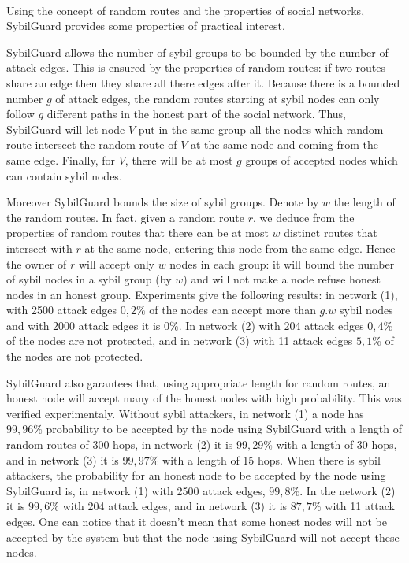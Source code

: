 \documentclass[a4paper,11pt]{article}
\begin{document}
\paragraph{}
Using the concept of random routes and the properties of social networks, SybilGuard provides some properties of practical interest.

SybilGuard allows the number of sybil groups to be bounded by the number of attack edges.
This is ensured by the properties of random routes: if two routes share an edge then they share all there edges after it.
Because there is a bounded number $g$ of attack edges, the random routes starting at sybil nodes can only follow $g$ different paths in the honest part of the social network.
Thus, SybilGuard will let node $V$ put in the same group all the nodes which random route intersect the random route of $V$ at the same node and coming from the same edge.
Finally, for $V$, there will be at most $g$ groups of accepted nodes which can contain sybil nodes. 

Moreover SybilGuard bounds the size of sybil groups.
Denote by $w$ the length of the random routes.
In fact, given a random route $r$, we deduce from the properties of random routes that there can be at most $w$ distinct routes that intersect with $r$ at the same node, entering this node from the same edge.
Hence the owner of $r$ will accept only $w$ nodes in each group: it will bound the number of sybil nodes in a sybil group (by $w$) and will not make a node refuse honest nodes in an honest group.
Experiments give the following results: in network (1), with 2500 attack edges $0,2\%$ of the nodes can accept more than $g.w$ sybil nodes and with 2000 attack edges it is $0\%$.
In network (2) with 204 attack edges $0,4\%$ of the nodes are not protected, and in network (3) with 11 attack edges $5,1\%$ of the nodes are not protected.

SybilGuard also garantees that, using appropriate length for random routes, an honest node will accept many of the honest nodes with high probability. 
This was verified experimentaly.
Without sybil attackers, in network (1) a node has $99,96\%$ probability to be accepted by the node using SybilGuard with a length of random routes of 300 hops, in network (2) it is $99,29\%$ with a length of 30 hops, and in network (3) it is $99,97\%$ with a length of 15 hops.
When there is sybil attackers, the probability for an honest node to be accepted by the node using SybilGuard is, in network (1) with 2500 attack edges, $99,8\%$.
In the network (2) it is $99,6\%$ with 204 attack edges, and in network (3) it is $87,7\%$ with 11 attack edges.
One can notice that it doesn't mean that some honest nodes will not be accepted by the system but that the node using SybilGuard will not accept these nodes.
\end{document}
